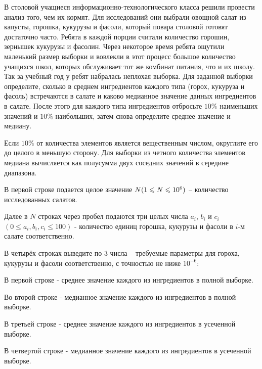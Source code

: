 
В столовой учащиеся информационно-технологического класса решили провести анализ того, чем их кормят. Для исследований они выбрали овощной салат из капусты, горошка, кукурузы и фасоли, который повара столовой готовят достаточно часто. Ребята в каждой порции считали количество горошин, зернышек кукурузы и фасолин. Через некоторое время ребята ощутили маленький размер выборки и вовлекли в этот процесс большое количество учащихся школ, которых обслуживает тот же комбинат питания, что и их школу. Так за учебный год у ребят набралась неплохая выборка. Для заданной выборки определите, сколько в среднем ингредиентов каждого типа (горох, кукуруза и фасоль) встречаются в салате и каково медианное значение данных ингредиентов в салате. После этого для каждого типа ингредиентов отбросьте $10\%$  наименьших значений и $10\%$  наибольших, затем снова определите среднее значение и медиану.

\explanationSection

Если $10\%$ от количества элементов является вещественным числом, округлите его до целого в меньшую сторону. Для выборки из четного количества элементов медиана вычисляется как полусумма двух соседних значений в середине диапазона.


В первой строке подается целое значение $ N \space (1 \leq N \leq 10^6) $ -- количество исследованных салатов. 

Далее в $ N $ строках через пробел подаются три целых числа $ a_i $, $ b_i $ и $ c_i$ \linebreak $(0 \leq a_i, b_i, c_i \leq 100) $ - количество единиц горошка, кукурузы и фасоли в $i$-м салате соответственно.

\outputfmtSection

В четырёх строках выведите по 3 числа -- требуемые параметры для гороха, кукурузы и фасоли соответственно, с точностью не ниже $10^{-6}$:

В первой строке - среднее значение каждого из ингредиентов в полной выборке.

Во второй строке - медианное значение каждого из ингредиентов в полной выборке.

В третьей строке - среднее значение каждого из ингредиентов в усеченной выборке.

В четвертой строке - медианное значение каждого из ингредиентов в усеченной выборке.

\markSection

